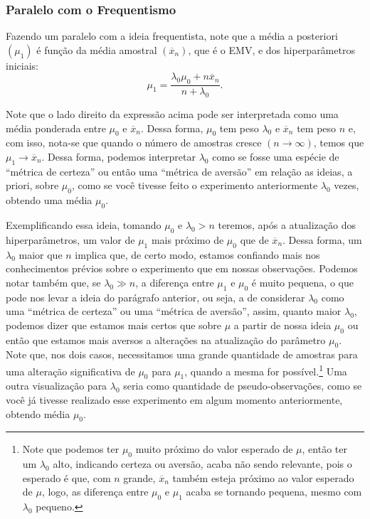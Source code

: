 \documentclass{article}
\begin{document}
\subsubsection*{Paralelo com o Frequentismo}

Fazendo um paralelo com a ideia frequentista, note que a média a posteriori $\left(\mu_1\right)$ é função da média amostral $\left(\overline{x}_n\right)$, que é o EMV, e dos hiperparâmetros iniciais:
\[\mu_1 = \dfrac{\lambda_0\mu_0 + n\overline{x}_n}{n + \lambda_0}.\]

Note que o lado direito da expressão acima pode ser interpretada como uma média ponderada entre $\mu_0$ e $\overline{x}_n$. Dessa forma, $\mu_0$ tem peso $\lambda_0$ e $\overline{x}_n$ tem peso $n$ e, com isso, nota-se que quando o número de amostras cresce $(n \to \infty)$, temos que $\mu_1 \to \overline{x}_n$. Dessa forma, podemos interpretar $\lambda_0$ como se fosse uma espécie de ``métrica de certeza'' ou então uma ``métrica de aversão'' em relação as ideias, a priori, sobre $\mu_0$, como se você tivesse feito o experimento anteriormente $\lambda_0$ vezes, obtendo uma média $\mu_0$.

Exemplificando essa ideia, tomando $\mu_0$ e $\lambda_0 > n$ teremos, após a atualização dos hiperparâmetros, um valor de $\mu_1$ mais próximo de $\mu_0$ que de $\overline{x}_n$. Dessa forma, um $\lambda_0$ maior que $n$ implica que, de certo modo, estamos confiando mais nos conhecimentos prévios sobre o experimento que em nossas observações. Podemos notar também que, se $\lambda_0 \gg n$, a diferença entre $\mu_1$ e $\mu_0$ é muito pequena, o que pode nos levar a ideia do parágrafo anterior, ou seja, a de considerar $\lambda_0$ como uma ``métrica de certeza'' ou uma ``métrica de aversão'', assim, quanto maior $\lambda_0$, podemos dizer que estamos mais certos que sobre $\mu$ a partir de nossa ideia $\mu_0$ ou então que estamos mais aversos a alterações na atualização do parâmetro $\mu_0$. Note que, nos dois casos, necessitamos uma grande quantidade de amostras para uma alteração significativa de $\mu_0$ para $\mu_1$, quando a mesma for possível.\footnote{Note que podemos ter $\mu_0$ muito próximo do valor esperado de $\mu$, então ter um $\lambda_0$ alto, indicando certeza ou aversão, acaba não sendo relevante, pois o esperado é que, com $n$ grande, $\overline{x}_n$ também esteja próximo ao valor esperado de $\mu$, logo, as diferença entre $\mu_0$ e $\mu_1$ acaba se tornando pequena, mesmo com $\lambda_0$ pequeno.} Uma outra visualização para $\lambda_0$ seria como quantidade de pseudo-observações, como se você já tivesse realizado esse experimento em algum momento anteriormente, obtendo média $\mu_0$.
\end{document}
